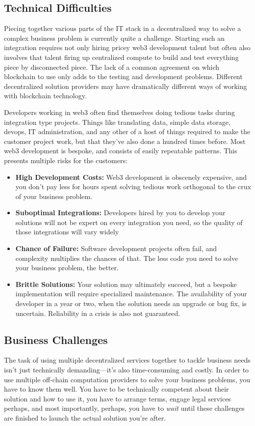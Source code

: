 \documentclass[11pt]{article}
\begin{document}
\subsection{Technical Difficulties}
Piecing together various parts of the IT stack in a decentralized way to solve a complex business problem is currently quite a challenge. Starting such an integration requires not only hiring pricey web3 development talent but often also involves that talent firing up centralized compute to build and test everything piece by disconnected piece. The lack of a common agreement on which blockchain to use only adds to the testing and development problems. Different decentralized solution providers may have dramatically different ways of working with blockchain technology. 

Developers working in web3 often find themselves doing tedious tasks during integration type projects. Things like translating data, simple data storage, devops, IT administration, and any other of a host of things required to make the customer project work, but that they've also done a hundred times before. Most web3 development is bespoke, and consists of easily repeatable patterns. This presents multiple risks for the customers:
\begin{itemize}
  \item \textbf{High Development Costs:} Web3 development is obscenely expensive, and you don't pay less for hours spent solving tedious work orthogonal to the crux of your business problem.
  \item \textbf{Suboptimal Integrations:} Developers hired by you to develop your solutions will not be expert on every integration you need, so the quality of those integrations will vary widely
  \item \textbf{Chance of Failure:} Software development projects often fail, and complexity multiplies the chances of that. The less code you need to solve your business problem, the better.
  \item \textbf{Brittle Solutions:} Your solution may ultimately succeed, but a bespoke implementation will require specialized maintenance. The availability of your developer in a year or two, when the solution needs an upgrade or bug fix, is uncertain. Reliability in a crisis is also not guaranteed.
\end{itemize}

\subsection{Business Challenges}
The task of using multiple decentralized services together to tackle business needs isn't just technically demanding—it's also time-consuming and costly. In order to use multiple off-chain computation providers to solve your business problems, you have to know them well. You have to be technically competent about their solution and how to use it, you have to arrange terms, engage legal services perhaps, and most importantly, perhaps, you have to \textit{wait} until these challenges are finished to launch the actual solution you're after. 
\end{document}
